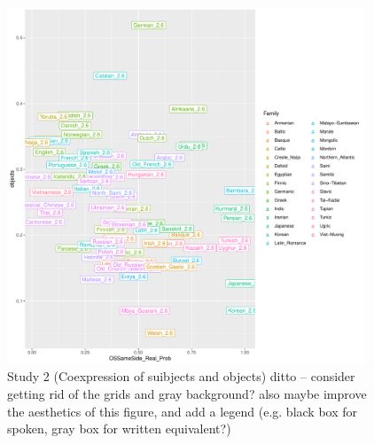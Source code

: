 \documentclass[11pt,a4paper]{article}
\newcommand\comment[1]{{\color{red}#1}}
\begin{document}
\begin{figure}
    \centering
    \includegraphics[width=0.95\textwidth]{figures/objects-order-pureud-byVerb.pdf}
    \caption{Study 2 (Coexpression of suibjects and objects) \comment{ditto -- consider getting rid of the grids and gray background? also maybe improve the aesthetics of this figure, and add a legend (e.g. black box for spoken, gray box for written equivalent?)}}
    \label{fig:study2}
\end{figure}









\end{document}
